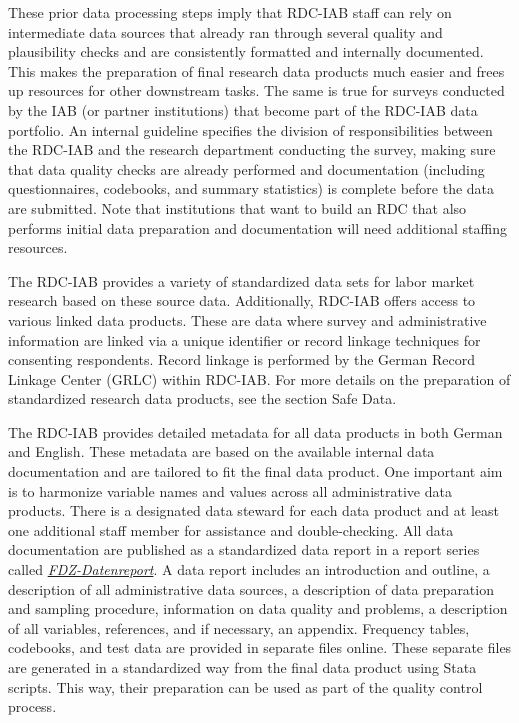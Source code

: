 These prior data processing steps imply that RDC-IAB staff can rely on intermediate data sources that already ran through several quality and plausibility checks and are consistently formatted and internally documented. This makes the preparation of final research data products much easier and frees up resources for other downstream tasks. The same is true for surveys conducted by the IAB (or partner institutions) that become part of the RDC-IAB data portfolio. An internal guideline specifies the division of responsibilities between the RDC-IAB and the research department conducting the survey, making sure that data quality checks are already performed and documentation (including questionnaires, codebooks, and summary statistics) is complete before the data are submitted. Note that institutions that want to build an RDC that also performs initial data preparation and documentation will need additional staffing resources.

The RDC-IAB provides a variety of standardized data sets for labor market research based on these source data. Additionally, RDC-IAB offers access to various linked data products. These are data where survey and administrative information are linked via a unique identifier or record linkage techniques for consenting respondents. Record linkage is performed by the German Record Linkage Center (GRLC) within RDC-IAB. For more details on the preparation of standardized research data products, see the section Safe Data.

The RDC-IAB provides detailed metadata for all data products in both German and English. These metadata are based on the available internal data documentation and are tailored to fit the final data product. One important aim is to harmonize variable names and values across all administrative data products. There is a designated data steward for each data product and at least one additional staff member for assistance and double-checking. All data documentation are published as a standardized data report in a report series called \href{https://fdz.iab.de/en/FDZ_Publications/FDZ_Publication_Series/FDZ-Datenreporte.aspx}{\emph{FDZ-Datenreport}}. A data report includes an introduction and outline, a description of all administrative data sources, a description of data preparation and sampling procedure, information on data quality and problems, a description of all variables, references, and if necessary, an appendix. Frequency tables, codebooks, and test data are provided in separate files online. These separate files are generated in a standardized way from the final data product using Stata scripts. This way, their preparation can be used as part of the quality control process.

